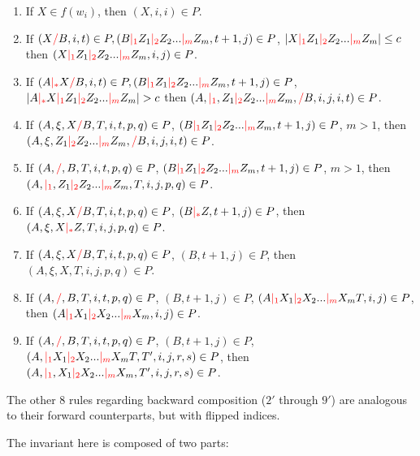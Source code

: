 \documentclass[main.tex]{subfiles}
\begin{document}
\begin{enumerate}
    \item If $X \in f(w_i)$, then $(X, i, i) \in P$.
    \item If $(X \textcolor{red}{/} B, i, t) \in P, (B \textcolor{red}{|_{1}} Z_1 \textcolor{red}{|_{2}} Z_2 ... \textcolor{red}{|_{m}} Z_m, t + 1, j) \in P$,
        $|X \textcolor{red}{|_{1}} Z_1 \textcolor{red}{|_{2}} Z_2 ... \textcolor{red}{|_{m}} Z_m| \leq c$
        then $(X \textcolor{red}{|_{1}} Z_1 \textcolor{red}{|_{2}} Z_2 ... \textcolor{red}{|_{m}} Z_m, i, j) \in P$.
    \item If $(A \textcolor{red}{|_{*}} X \textcolor{red}{/} B, i, t) \in P, (B \textcolor{red}{|_{1}} Z_1 \textcolor{red}{|_{2}} Z_2 ... \textcolor{red}{|_{m}} Z_m, t + 1, j) \in P$,
        $|A \textcolor{red}{|_{*}} X \textcolor{red}{|_{1}} Z_1 \textcolor{red}{|_{2}} Z_2 ... \textcolor{red}{|_{m}} Z_m| > c$
        then $(A, \textcolor{red}{|_{1}}, Z_1 \textcolor{red}{|_{2}} Z_2 ... \textcolor{red}{|_{m}} Z_m, \textcolor{red}{/} B, i, j, i, t) \in P$.
    \item If $(A, \xi, X \textcolor{red}{/} B, T, i, t, p, q) \in P$,
        $(B \textcolor{red}{|_{1}} Z_1 \textcolor{red}{|_{2}} Z_2 ... \textcolor{red}{|_{m}} Z_m, t + 1, j) \in P$,
        $m > 1$, then $(A, \xi, Z_1 \textcolor{red}{|_{2}} Z_2 ... \textcolor{red}{|_{m}} Z_m, \textcolor{red}{/} B, i, j, i, t) \in P$.
    \item If $(A, \textcolor{red}{/}, B, T, i, t, p, q) \in P$,
        $(B \textcolor{red}{|_{1}} Z_1 \textcolor{red}{|_{2}} Z_2 ... \textcolor{red}{|_{m}} Z_m, t + 1, j) \in P$,
        $m > 1$, then $(A, \textcolor{red}{|_{1}}, Z_1 \textcolor{red}{|_{2}} Z_2 ... \textcolor{red}{|_{m}} Z_m, T, i, j, p, q) \in P$.
    \item If $(A, \xi, X \textcolor{red}{/} B, T, i, t, p, q) \in P$,
        $(B \textcolor{red}{|_{*}} Z, t + 1, j) \in P$,
        then $(A, \xi, X \textcolor{red}{|_{*}} Z, T, i, j, p, q) \in P$.
    \item If $(A, \xi, X \textcolor{red}{/} B, T, i, t, p, q) \in P$,
        $(B, t + 1, j) \in P$,
        then $(A, \xi, X, T, i, j, p, q) \in P$.
    \item If $(A, \textcolor{red}{/}, B, T, i, t, p, q) \in P$,
        $(B, t + 1, j) \in P$, $(A \textcolor{red}{|_{1}} X_1 \textcolor{red}{|_{2}} X_2 ... \textcolor{red}{|_{m}} X_m T, i, j) \in P$,
        then $(A \textcolor{red}{|_{1}} X_1 \textcolor{red}{|_{2}} X_2 ... \textcolor{red}{|_{m}} X_m, i, j) \in P$.
    \item If $(A, \textcolor{red}{/}, B, T, i, t, p, q) \in P$,
        $(B, t + 1, j) \in P$, $(A, \textcolor{red}{|_{1}} X_1 \textcolor{red}{|_{2}} X_2 ... \textcolor{red}{|_{m}} X_m T, T', i, j, r, s) \in P$,
        then $(A, \textcolor{red}{|_{1}}, X_1 \textcolor{red}{|_{2}} X_2 ... \textcolor{red}{|_{m}} X_m, T', i, j, r, s) \in P$.
\end{enumerate}

The other 8 rules regarding backward composition
($2'$ through $9'$) are analogous to their forward counterparts, but with
flipped indices.

The invariant here is composed of two parts:
\end{document}
